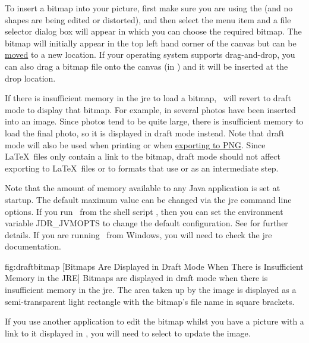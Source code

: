 
To insert a \gls{bitmap} into your picture, first make sure you are using
the  (and no shapes are
being edited or distorted), and then select the menu item
 and a file selector dialog box will appear in which
you can choose the required \gls{bitmap}. The \gls{bitmap} will initially appear
in the top left hand corner of the \gls{canvas} but can be
\hyperref[sec:moveobjects]{moved} to a new location.  If your
operating system supports \gls{drag-and-drop}, you can also drag a
\gls{bitmap} file onto the \gls{canvas} (in \selectmode) and it will
be inserted at the drop location.

If there is insufficient memory in the \gls{jre} to load a bitmap,
\FlowframTk\ will revert to draft mode to display that bitmap.  For
example, in  several photos have been
inserted into an image. Since photos tend to be quite large, there
is insufficient memory to load the final photo, so it is displayed
in draft mode instead. Note that draft mode will also be used when
printing or when \hyperref[sec:exportpng]{exporting to PNG}. Since \LaTeX\ files
only contain a link to the bitmap, draft mode should not affect
exporting to \LaTeX\ files or to formats that use  or
 as an intermediate step.

Note that the amount of memory available to any Java application is
set at startup. The default maximum value can be changed via the
\gls{jre} command line options.  If you run \FlowframTk\ from the
shell script , then you can set the environment
variable \gls{JDR_JVMOPTS} to change the default configuration. See
 for further details. If you are running
\FlowframTk\ from Windows, you will need to check the \gls*{jre}
documentation.

\FloatFig
  {fig:draftbitmap}
  {}
  [Bitmaps Are Displayed in Draft Mode When There is Insufficient Memory in the JRE]
  {Bitmaps are displayed in draft mode
when there is insufficient memory in the \gls{jre}. The area taken up by
the image is displayed as a semi-transparent light  rectangle
with the bitmap's file name in square brackets.}


If you use another application to edit the bitmap whilst
you have a picture with a link to it displayed in \FlowframTk, you will
need to select  to update the image.

